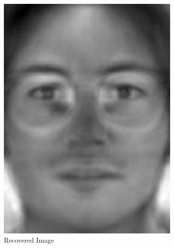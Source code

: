 \documentclass[review]{elsarticle}
\begin{document}
\begin{figure}[H]
\begin{subfigure}[b]{0.18\textwidth}
	\includegraphics[width=\linewidth]{Fig_6b}
		\caption{Recovered Image}
	\label{fig:recov_image_ex_4} \hfill
\end{subfigure}
\begin{subfigure}[b]{0.18\textwidth} 
\centering

\end{subfigure}
\end{figure}
\end{document}
